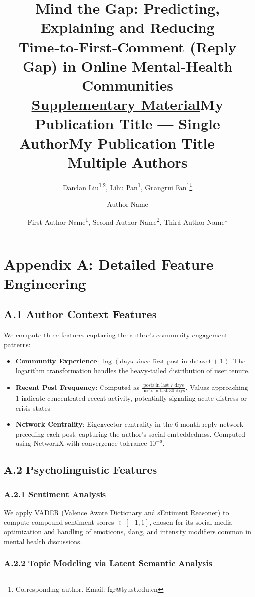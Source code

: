 \documentclass[letterpaper]{article} %
\title{Mind the Gap: Predicting, Explaining and Reducing Time‑to‑First‑Comment (Reply Gap) in Online Mental‑Health Communities \\
\underline{Supplementary Material}}
\author{
    Dandan Liu\textsuperscript{\rm 1,\rm 2},
    Lihu Pan\textsuperscript{\rm 1},
    Guangrui Fan\textsuperscript{\rm 1}\thanks{Corresponding author. Email: fgr@tyust.edu.cn}
}
\title{My Publication Title --- Single Author}
\author {
    Author Name
}
\title{My Publication Title --- Multiple Authors}
\author {
    First Author Name\textsuperscript{\rm 1},
    Second Author Name\textsuperscript{\rm 2},
    Third Author Name\textsuperscript{\rm 1}
}
\begin{document}
\maketitle

\section{Appendix A: Detailed Feature Engineering}
\subsection{A.1 Author Context Features}

We compute three features capturing the author's community engagement patterns:

\begin{itemize}
\item \textbf{Community Experience}: $\log(\text{days since first post in dataset} + 1)$. The logarithm transformation handles the heavy-tailed distribution of user tenure.

\item \textbf{Recent Post Frequency}: Computed as $\frac{\text{posts in last 7 days}}{\text{posts in last 30 days}}$. Values approaching 1 indicate concentrated recent activity, potentially signaling acute distress or crisis states.

\item \textbf{Network Centrality}: Eigenvector centrality in the 6-month reply network preceding each post, capturing the author's social embeddedness. Computed using NetworkX with convergence tolerance $10^{-6}$.
\end{itemize}

\subsection{A.2 Psycholinguistic Features}

\subsubsection{A.2.1 Sentiment Analysis}
We apply VADER (Valence Aware Dictionary and sEntiment Reasoner) to compute compound sentiment scores $\in [-1, 1]$, chosen for its social media optimization and handling of emoticons, slang, and intensity modifiers common in mental health discussions.

\subsubsection{A.2.2 Topic Modeling via Latent Semantic Analysis}
\end{document}
